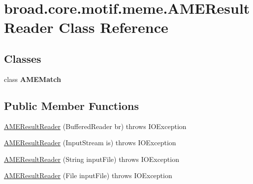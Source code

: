\hypertarget{classbroad_1_1core_1_1motif_1_1meme_1_1_a_m_e_result_reader}{\section{broad.\+core.\+motif.\+meme.\+A\+M\+E\+Result\+Reader Class Reference}
\label{classbroad_1_1core_1_1motif_1_1meme_1_1_a_m_e_result_reader}
}
\subsection*{Classes}
\begin{DoxyCompactItemize}
\item 
class {\bfseries A\+M\+E\+Match}
\end{DoxyCompactItemize}
\subsection*{Public Member Functions}
\begin{DoxyCompactItemize}
\item 
\hyperlink{classbroad_1_1core_1_1motif_1_1meme_1_1_a_m_e_result_reader_af19f84d98a0975bb9ffa56914e44857c}{A\+M\+E\+Result\+Reader} (Buffered\+Reader br)  throws I\+O\+Exception 
\item 
\hyperlink{classbroad_1_1core_1_1motif_1_1meme_1_1_a_m_e_result_reader_a3af48433f063f94120f708de40118ffe}{A\+M\+E\+Result\+Reader} (Input\+Stream is)  throws I\+O\+Exception 
\item 
\hyperlink{classbroad_1_1core_1_1motif_1_1meme_1_1_a_m_e_result_reader_ad65dc97c76ea69d13a323de9ea7fec2c}{A\+M\+E\+Result\+Reader} (String input\+File)  throws I\+O\+Exception 
\item 
\hyperlink{classbroad_1_1core_1_1motif_1_1meme_1_1_a_m_e_result_reader_a31d6dc352f3149e4a8dc5133cc622dee}{A\+M\+E\+Result\+Reader} (File input\+File)  throws I\+O\+Exception 
\end{DoxyCompactItemize}


